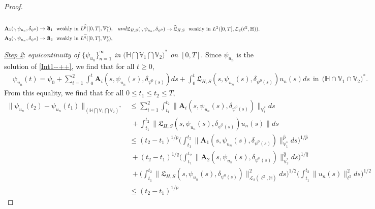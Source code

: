 \documentclass[11pt]{article}
\renewcommand{\leq}{\leqslant}
\renewcommand{\geq}{\geqslant}  %
\numberwithin{equation}{section}
\begin{document}
\begin{proof}
\begin{subequations}
\begin{align}
			\\& \label{weak3}			\mathbf{A}_1(\cdot,\psi_{u_n},
\delta_{\psi^0}) \rightarrow \mathfrak{A}_1\ \  \mbox{weakly in $ L^{\widehat{p}}([0,T], \mathbb{V}^*_1)$},
\\&\label{weak4}	 \mathbf{A}_2(\cdot,\psi_{u_n},
\delta_{\psi^0}) \rightarrow \mathfrak{A}_2\ \  \mbox{weakly in $ L^{\widehat{q}}([0,T], \mathbb{V}^*_2)$},
		\end{align}
		and
		\begin{align}
			\label{weak5}
		\mathfrak{L}_{H,S}(\cdot,\psi_{u_n},
\delta_{\psi^0})\rightarrow \widehat{\mathfrak{L}}_{H,S} \ \ \mbox{weakly in $L^2([0,T],\mathcal{L}_2(\ell^2,
\mathbb{H}))$}.
		\end{align}
	\end{subequations}


\underline{\emph{Step 2}}: \emph{equicontinuity of $\{\psi_{u_n}\}_{n=1}^\infty$ in $\big(\mathbb{H}\bigcap\mathbb{V}_1
\bigcap\mathbb{V}_2\big)^*$ on $[0,T]$}.
Since $\psi_{u_n}$ is the solution of \eqref{Int1--++}, we find that for all $t\geq0$,
\begin{align*}
&\psi_{u_n}(t)=\psi_0 +\sum_{i=1}^2\int_0^t
 \mathbf{A}_i(s,\psi_{u_n}(s),
\delta_{\psi^0(s)})ds
 + \int_0^t\mathfrak{L}_{H,S}(s,\psi_{u_n}(s),
\delta_{\psi^0(s)})u_n(s)ds\ \ \mbox{in}\ \ \big(\mathbb{H}\cap\mathbb{V}_1
\cap\mathbb{V}_2\big)^*.
\end{align*}
From this equality, we find that for all $0\leq t_1\leq t_2\leq T$,
\begin{align} \label{weak6}
\|\psi_{u_n}(t_2)-\psi_{u_n}(t_1)
\|_{(\mathbb{H}\bigcap\mathbb{V}_1
\bigcap\mathbb{V}_2)^*}&\leq
\sum_{i=1}^2\int_{t_1}^{t_2}
 \|\mathbf{A}_i(s,\psi_{u_n}(s),
\delta_{\psi^0(s)})\|_{\mathbb{V}_i^*}ds
\nonumber\\&\ + \int_{t_1}^{t_2}\|\mathfrak{L}_{H,S}(s,\psi_{u_n}(s),
\delta_{\psi^0(s)})u_n(s)
\|ds
\nonumber\\&\leq(t_2-t_1)^{1/p}
 \bigg(\int_{t_1}^{t_2}\|\mathbf{A}_1(s,\psi_{u_n}(s),
\delta_{\psi^0(s)})\|^{\widehat{p}
}_{\mathbb{V}_1^*}ds\bigg)^{1/\widehat{p}}
\nonumber\\&\ +(t_2-t_1)^{1/q}
\bigg(\int_{t_1}^{t_2}\|\mathbf{A}_2(s,\psi_{u_n}(s),
\delta_{\psi^0(s)})\|^{\widehat{q}
}_{\mathbb{V}_2^*}ds\bigg)^{1/\widehat{q}}
\nonumber\\&\
 + \bigg(\int_{t_1}^{t_2}\|
 \mathfrak{L}_{H,S}(s,\psi_{u_n}(s),
\delta_{\psi^0(s)})\|_{\mathcal{L}_2(\ell^2
 ,\mathbb{H})}^2ds
\bigg)^{1/2}
\bigg(\int_{t_1}^{t_2}\|u_n(s)
\|_{\ell^2}^2ds\bigg)^{1/2}
\nonumber\\&\leq(t_2-t_1)^{1/p}

\end{align}
\end{proof}
\end{document}
